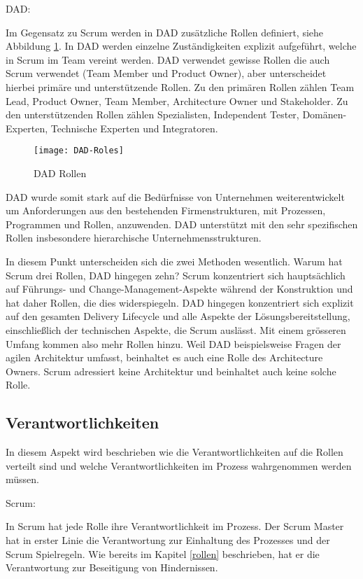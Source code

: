 \pagebreak
{\Large DAD:} \cite{dadRoles} \medskip

Im Gegensatz zu Scrum werden in DAD zusätzliche Rollen definiert, siehe Abbildung \ref{fig:dadrollen}. In DAD werden einzelne Zuständigkeiten explizit aufgeführt, welche in Scrum im Team vereint werden. DAD verwendet gewisse Rollen die auch Scrum verwendet (Team Member und Product Owner), aber unterscheidet hierbei primäre und unterstützende Rollen. Zu den primären Rollen zählen Team Lead, Product Owner, Team Member, Architecture Owner und Stakeholder. Zu den unterstützenden Rollen zählen Spezialisten, Independent Tester, Domänen-Experten, Technische Experten und Integratoren.

\begin{figure}[H]
	\centering
	\texttt{[image: DAD-Roles]}
	\caption{DAD Rollen \cite{dadRoles}}
	\label{fig:dadrollen}
\end{figure}

DAD wurde somit stark auf die Bedürfnisse von Unternehmen weiterentwickelt um Anforderungen aus den bestehenden Firmenstrukturen, mit Prozessen, Programmen und Rollen, anzuwenden. DAD unterstützt mit den sehr spezifischen Rollen insbesondere hierarchische Unternehmensstrukturen.
\bigskip


In diesem Punkt unterscheiden sich die zwei Methoden wesentlich. Warum hat Scrum drei Rollen, DAD hingegen zehn? Scrum konzentriert sich hauptsächlich auf Führungs- und Change-Management-Aspekte während der Konstruktion und hat daher Rollen, die dies widerspiegeln. DAD hingegen konzentriert sich explizit auf den gesamten Delivery Lifecycle und alle Aspekte der Lösungsbereitstellung, einschließlich der technischen Aspekte, die Scrum auslässt. Mit einem grösseren Umfang kommen also mehr Rollen hinzu. Weil DAD beispielsweise Fragen der agilen Architektur umfasst, beinhaltet es auch eine Rolle des Architecture Owners. Scrum adressiert keine Architektur und beinhaltet auch keine solche Rolle.

\subsection{Verantwortlichkeiten}

In diesem Aspekt wird beschrieben wie die Verantwortlichkeiten auf die Rollen verteilt sind und welche Verantwortlichkeiten im Prozess wahrgenommen werden müssen.

{\Large Scrum:}\cite{scrumResponsibilites} \medskip

In Scrum hat jede Rolle ihre Verantwortlichkeit im Prozess. Der Scrum Master hat in erster Linie die Verantwortung zur Einhaltung des Prozesses und der Scrum Spielregeln. Wie bereits im Kapitel \ref{rollen} beschrieben, hat er die Verantwortung zur Beseitigung von Hindernissen.

